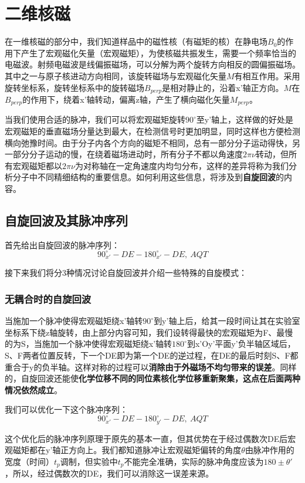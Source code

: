 \section{二维核磁}

在一维核磁的部分中，我们知道样品中的磁性核（有磁矩的核）在静电场$B_0$的作用下产生了宏观磁化矢量（宏观磁矩），为使核磁共振发生，需要一个频率恰当的电磁波。射频电磁波是线偏振磁场，可以分解为两个旋转方向相反的圆偏振磁场。其中之一与原子核进动方向相同，该旋转磁场与宏观磁化矢量$M$有相互作用。采用旋转坐标系，旋转坐标系中的旋转磁场$B_{perp}$是相对静止的，沿着x'轴正方向。$M$在$B_{perp}$的作用下，绕着x'轴转动，偏离z轴，产生了横向磁化矢量$M_{perp}$。

当我们使用合适的脉冲，我们可以将宏观磁矩旋转$90^{\circ}$至y'轴上，这样做的好处是宏观磁矩的垂直磁场分量达到最大，在检测信号时更加明显，同时这样也方便检测横向弛豫时间。由于分子内各个方向的磁矩不相同，总有一部分分子运动得快，另一部分分子运动的慢，在绕着磁场进动时，所有分子不都以角速度$2 \pi \nu$转动，但所有宏观磁矩都以$2 \pi \nu$为对称轴在一定角速度内均匀分布，这样的差异将称为我们分析分子中不同精细结构的重要信息。如何利用这些信息，将涉及到\textbf{自旋回波}的内容。

\subsection{自旋回波及其脉冲序列}

首先给出自旋回波的脉冲序列：
\[90^{\circ}_{x'}-DE-180^{\circ}_{x'}-DE, \ AQT\]

接下来我们将分3种情况讨论自旋回波并介绍一些特殊的自旋模式：

\subsubsection{无耦合时的自旋回波}

当施加一个脉冲使得宏观磁矩绕x'轴转$90^{\circ}$到y'轴上后，给其一段时间让其在实验室坐标系下绕z轴旋转，由上部分内容可知，我们设转得最快的宏观磁矩为F、最慢的为S，当施加一个脉冲使得宏观磁矩绕x'轴转$180^{\circ}$到x'Oy'平面y'负半轴区域后，S、F两者位置反转，下一个DE即为第一个DE的逆过程，在DE的最后时刻S、F都重合于y的负半轴。这样对称的过程可以\textbf{消除由于外磁场不均匀带来的误差}。同样的，自旋回波还能使\textbf{化学位移不同的同位素核化学位移重新聚集，这点在后面两种情况依然成立}。

我们可以优化一下这个脉冲序列：
\[90^{\circ}_{x'}-DE-180^{\circ}_{y'}-DE, \ AQT\]

这个优化后的脉冲序列原理于原先的基本一直，但其优势在于经过偶数次DE后宏观磁矩都在y'轴正方向上。我们都知道脉冲让宏观磁矩偏转的角度$\theta$由脉冲作用的宽度（时间）$t_p$调制，但实验中$t_p$不能完全准确，实际的脉冲角度应该为$180 \pm \theta'$，所以，经过偶数次的DE，我们可以消除这一误差来源。

